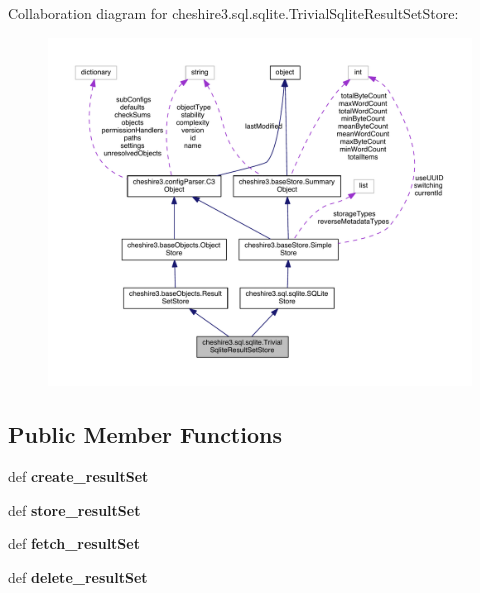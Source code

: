 Collaboration diagram for cheshire3.\-sql.\-sqlite.\-Trivial\-Sqlite\-Result\-Set\-Store\-:
\nopagebreak
\begin{figure}[H]
\begin{center}
\leavevmode
\includegraphics[width=350pt]{classcheshire3_1_1sql_1_1sqlite_1_1_trivial_sqlite_result_set_store__coll__graph}
\end{center}
\end{figure}
\subsection*{Public Member Functions}
\begin{DoxyCompactItemize}
\item 
\hypertarget{classcheshire3_1_1sql_1_1sqlite_1_1_trivial_sqlite_result_set_store_a0b20fa527a8323c547140ca74ac2ef46}{def {\bfseries create\-\_\-result\-Set}}\label{classcheshire3_1_1sql_1_1sqlite_1_1_trivial_sqlite_result_set_store_a0b20fa527a8323c547140ca74ac2ef46}

\item 
\hypertarget{classcheshire3_1_1sql_1_1sqlite_1_1_trivial_sqlite_result_set_store_aaada483635d9b58f8f53056a8886875d}{def {\bfseries store\-\_\-result\-Set}}\label{classcheshire3_1_1sql_1_1sqlite_1_1_trivial_sqlite_result_set_store_aaada483635d9b58f8f53056a8886875d}

\item 
\hypertarget{classcheshire3_1_1sql_1_1sqlite_1_1_trivial_sqlite_result_set_store_a943e62424f5701b66c16f5316cc20a90}{def {\bfseries fetch\-\_\-result\-Set}}\label{classcheshire3_1_1sql_1_1sqlite_1_1_trivial_sqlite_result_set_store_a943e62424f5701b66c16f5316cc20a90}

\item 
\hypertarget{classcheshire3_1_1sql_1_1sqlite_1_1_trivial_sqlite_result_set_store_a124c4f3882865c2d51c0509ee7819e44}{def {\bfseries delete\-\_\-result\-Set}}\label{classcheshire3_1_1sql_1_1sqlite_1_1_trivial_sqlite_result_set_store_a124c4f3882865c2d51c0509ee7819e44}

\end{DoxyCompactItemize}
